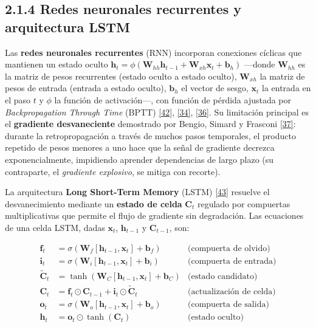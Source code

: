 \documentclass[12pt,letterpaper]{report}
\newcommand{\cita}[1]{\hyperref[bib:#1]{[#1]}}
\begin{document}
\subsection{2.1.4 Redes neuronales recurrentes y arquitectura LSTM}

Las \textbf{redes neuronales recurrentes} (RNN) incorporan conexiones cíclicas que mantienen un estado oculto $\mathbf{h}_t = \phi(\mathbf{W}_{hh}\mathbf{h}_{t-1} + \mathbf{W}_{xh}\mathbf{x}_t + \mathbf{b}_h)$ ---donde $\mathbf{W}_{hh}$ es la matriz de pesos recurrentes (estado oculto a estado oculto), $\mathbf{W}_{xh}$ la matriz de pesos de entrada (entrada a estado oculto), $\mathbf{b}_h$ el vector de sesgo, $\mathbf{x}_t$ la entrada en el paso $t$ y $\phi$ la función de activación---, con función de pérdida ajustada por \textit{Backpropagation Through Time} (BPTT) \cita{42}, \cita{34}, \cita{36}. Su limitación principal es el \textbf{gradiente desvaneciente} demostrado por Bengio, Simard y Frasconi \cita{37}: durante la retropropagación a través de muchos pasos temporales, el producto repetido de pesos menores a uno hace que la señal de gradiente decrezca exponencialmente, impidiendo aprender dependencias de largo plazo (su contraparte, el \textit{gradiente explosivo}, se mitiga con recorte).

La arquitectura \textbf{Long Short-Term Memory} (LSTM) \cita{43} resuelve el desvanecimiento mediante un \textbf{estado de celda} $\mathbf{C}_t$ regulado por compuertas multiplicativas que permite el flujo de gradiente sin degradación. Las ecuaciones de una celda LSTM, dadas $\mathbf{x}_t$, $\mathbf{h}_{t-1}$ y $\mathbf{C}_{t-1}$, son:

\begin{align}
    \mathbf{f}_t &= \sigma(\mathbf{W}_f [\mathbf{h}_{t-1}, \mathbf{x}_t] + \mathbf{b}_f) & \text{(compuerta de olvido)}\\
    \mathbf{i}_t &= \sigma(\mathbf{W}_i [\mathbf{h}_{t-1}, \mathbf{x}_t] + \mathbf{b}_i) & \text{(compuerta de entrada)}\\
    \tilde{\mathbf{C}}_t &= \tanh(\mathbf{W}_C [\mathbf{h}_{t-1}, \mathbf{x}_t] + \mathbf{b}_C) & \text{(estado candidato)}\\
    \mathbf{C}_t &= \mathbf{f}_t \odot \mathbf{C}_{t-1} + \mathbf{i}_t \odot \tilde{\mathbf{C}}_t & \text{(actualización de celda)}\\
    \mathbf{o}_t &= \sigma(\mathbf{W}_o [\mathbf{h}_{t-1}, \mathbf{x}_t] + \mathbf{b}_o) & \text{(compuerta de salida)}\\
    \mathbf{h}_t &= \mathbf{o}_t \odot \tanh(\mathbf{C}_t) & \text{(estado oculto)}
\end{align}
\end{document}
